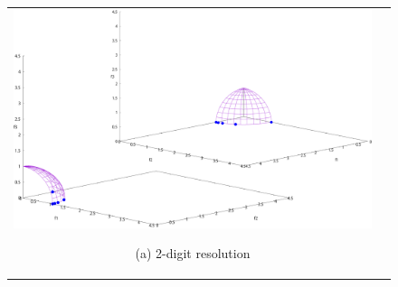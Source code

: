 \documentclass[../main/main]{subfiles}
\begin{document}
\begin{figure}[htbp]
\begin{tabular}{cc}
\begin{minipage}{0.32\hsize}
\includegraphics[width=1\linewidth]{../figures/MOEAD/DTLZ4_another_digi2_double.pdf}
\begin{center}
{\footnotesize (a) 2-digit resolution}
\end{center}
\end{minipage}
\end{tabular}
\end{figure}
\end{document}
